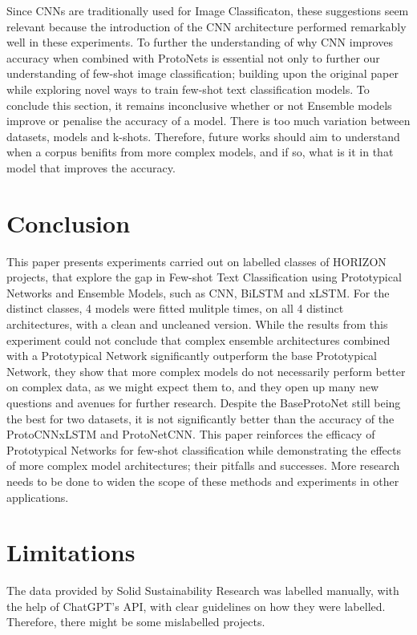 \documentclass[11pt]{article}
\begin{document}
Since CNNs are traditionally used for Image Classificaton, these suggestions seem relevant because the introduction of the CNN architecture performed remarkably well in these experiments. To further the understanding of why CNN improves accuracy when combined with ProtoNets is essential not only to further our understanding of
 few-shot image classification; building upon the original paper while exploring novel ways to train few-shot text classification models. 
To conclude this section, it remains inconclusive whether or not Ensemble models improve or penalise the accuracy of a model. There is too much variation between datasets, models and k-shots. Therefore, future works should aim to understand when a corpus benifits from more complex models, and if so, what is it in that model that improves the accuracy. 

\section{Conclusion}

This paper presents experiments carried out on labelled classes of HORIZON projects, that explore the gap in Few-shot Text Classification using Prototypical Networks and Ensemble Models, such as CNN, BiLSTM and xLSTM.
For the distinct classes, 4 models were fitted mulitple times, on all 4 distinct architectures, with a clean and uncleaned version.
While the results from this experiment could not conclude that complex ensemble architectures combined with a Prototypical Network significantly outperform the base Prototypical Network, they show that more complex models do not necessarily perform better on complex data, as we might expect them to, and they open up many new questions and avenues for further research.
Despite the BaseProtoNet still being the best for two datasets, it is not significantly better than the accuracy of the ProtoCNNxLSTM and ProtoNetCNN.
This paper reinforces the efficacy of Prototypical Networks for few-shot classification while demonstrating the effects of more complex model architectures; their pitfalls and successes.
More research needs to be done to widen the scope of these methods and experiments in other applications.

\section{Limitations}

The data provided by Solid Sustainability Research was labelled manually, with the help of ChatGPT's API, with clear guidelines on how they were labelled. \cite{pereira2025classifying}
Therefore, there might be some mislabelled projects.
\end{document}

